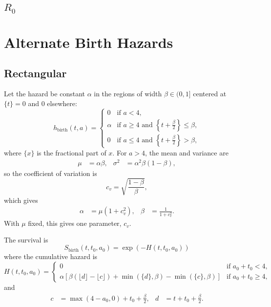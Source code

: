 \documentclass{article}
\begin{document}
\subsection{$R_0$}


\appendix

\section{Alternate Birth Hazards}

\subsection{Rectangular}

Let the hazard be constant $\alpha$ in the regions of width
$\beta \in (0, 1]$ centered at $\{t\} = 0$ and $0$ elsewhere:
\begin{equation}
  h_{\text{birth}} (t, a) =
  \begin{cases}
    0 & \text{if $a < 4$},
    \\
    \alpha & \text{if $a \geq 4$ and $\left\{t + \frac{\beta}{2}\right\}
      \leq \beta$},
    \\
    0 & \text{if $a \leq 4$ and $\left\{t + \frac{\beta}{2}\right\}
      > \beta$},
  \end{cases}
\end{equation}
where $\{x\}$ is the fractional part of $x$.  For $a > 4$, the mean
and variance are
\begin{align}
  \mu &= \alpha \beta,
  &
  \sigma^2 &= \alpha^2 \beta (1 - \beta),
\end{align}
so the coefficient of variation is
\begin{equation}
  c_v = \sqrt{\frac{1 - \beta}{\beta}},
\end{equation}
which gives
\begin{align}
  \alpha &= \mu \left(1 + c_v^2\right),
  &
  \beta &= \frac{1}{1 + c_v^2}.
\end{align}
With $\mu$ fixed, this gives one parameter, $c_v$.

The survival is
\begin{equation}
  S_{\text{birth}}(t, t_0, a_0) =
  \exp\left(-H(t, t_0, a_0)\right)
\end{equation}
where the cumulative hazard is
\begin{equation}
  H(t, t_0, a_0) =
  \begin{cases}
    0 & \text{if $a_0 + t_0 < 4$},
    \\
    \alpha \left[
      \beta (\lfloor d \rfloor - \lfloor c \rfloor)
      + \min(\{d\}, \beta)
      - \min(\{c\}, \beta)
    \right]
    & \text{if $a_0 + t_0 \geq 4$},
  \end{cases}
\end{equation}
and
\begin{align}
  c &= \max(4 - a_0, 0) + t_0 + \frac{\beta}{2},
  &
  d &= t + t_0 + \frac{\beta}{2}.
\end{align}
\end{document}
